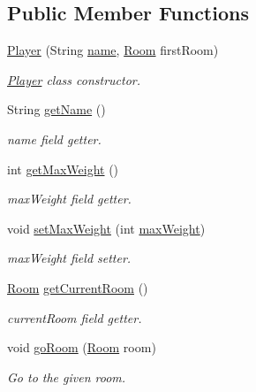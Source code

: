 \subsection*{Public Member Functions}
\begin{DoxyCompactItemize}
\item 
\hyperlink{classpkg__world_1_1Player_a8a48bf28cae733a412a0114802a1e4fb}{Player} (String \hyperlink{classpkg__world_1_1Player_ab4c41ebebb7fcc55fa253e48af0c4267}{name}, \hyperlink{classpkg__world_1_1Room}{Room} first\-Room)
\begin{DoxyCompactList}\small\item\em \hyperlink{classpkg__world_1_1Player}{Player} class constructor. \end{DoxyCompactList}\item 
String \hyperlink{classpkg__world_1_1Player_afb52f93ed1c1ee43462f0c33ca3abcf0}{get\-Name} ()
\begin{DoxyCompactList}\small\item\em name field getter. \end{DoxyCompactList}\item 
int \hyperlink{classpkg__world_1_1Player_a700bc1762736bd44d91e40ad9ae2ff76}{get\-Max\-Weight} ()
\begin{DoxyCompactList}\small\item\em max\-Weight field getter. \end{DoxyCompactList}\item 
void \hyperlink{classpkg__world_1_1Player_a6218134478709a2e1c4438f2c9f94b8a}{set\-Max\-Weight} (int \hyperlink{classpkg__world_1_1Player_a780685c88ad92ca6b280cf841ab33728}{max\-Weight})
\begin{DoxyCompactList}\small\item\em max\-Weight field setter. \end{DoxyCompactList}\item 
\hyperlink{classpkg__world_1_1Room}{Room} \hyperlink{classpkg__world_1_1Player_a5ff0ede152d97c0c9cf6603c9a422a77}{get\-Current\-Room} ()
\begin{DoxyCompactList}\small\item\em current\-Room field getter. \end{DoxyCompactList}\item 
void \hyperlink{classpkg__world_1_1Player_af694ca81b712f2ba0e18c3ae73c03bd4}{go\-Room} (\hyperlink{classpkg__world_1_1Room}{Room} room)
\begin{DoxyCompactList}\small\item\em Go to the given room. \end{DoxyCompactList}\item 

\end{DoxyCompactItemize}
